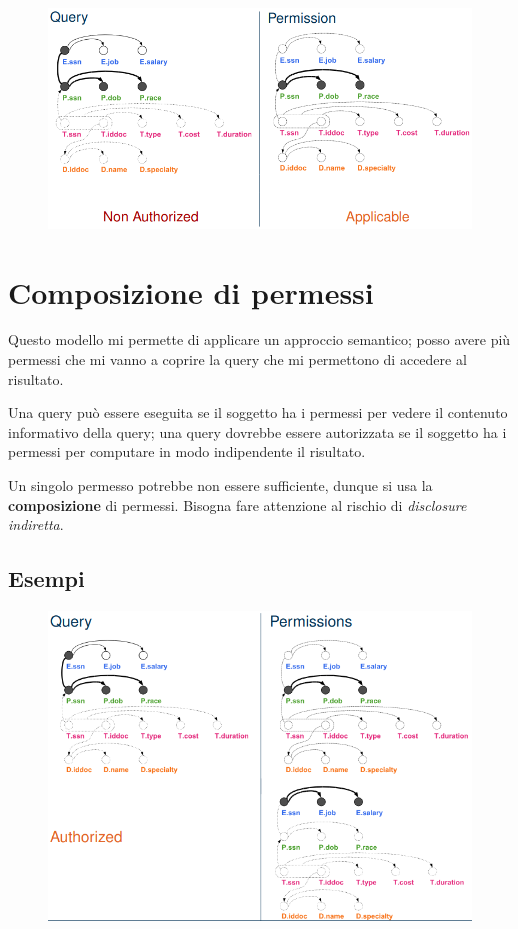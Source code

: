 \documentclass{report}
\begin{document}
\begin{figure}[H]
    \centering
    \includegraphics[width=1\linewidth]{images/perm3.png}
\end{figure}

\section{Composizione di permessi}
Questo modello mi permette di applicare un approccio semantico; posso avere più permessi che mi vanno 
a coprire la query che mi permettono di accedere al risultato.

\noindent Una query può essere eseguita se il soggetto ha i permessi per vedere il contenuto informativo della query; una query dovrebbe essere 
autorizzata se il soggetto ha i permessi per computare in modo indipendente il risultato.

\noindent Un singolo permesso potrebbe non essere sufficiente, dunque si usa la \textbf{composizione} di permessi. Bisogna fare attenzione
al rischio di \textit{disclosure indiretta}.

\subsection{Esempi}

\begin{figure}[H]
    \centering
    \includegraphics[width=1\linewidth]{images/comp1.png}
\end{figure}
\end{document}
